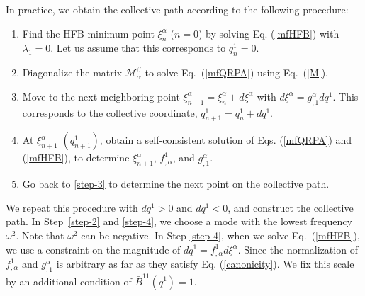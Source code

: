 \documentclass[%
superscriptaddress,
showpacs,
nofootinbib,
amsmath,amssymb,
aps,
prc,
twocolumn,
floatfix ]%
{revtex4-1}
\begin{document}
In practice, we obtain the collective path according to the following procedure:
\begin{enumerate}
\item Find the HFB minimum point $\xi^\alpha_n$ ($n=0$)
	by solving Eq. (\ref{mfHFB}) with $\lambda_1=0$.
	Let us assume that this corresponds to $q^1_n=0$.
\item \label{step-2}
	Diagonalize the matrix $\mathcal{M}^{\beta}_{\alpha}$
to solve Eq.~(\ref{mfQRPA}) using Eq.~(\ref{M}).
\item \label{step-3}
Move to the next meighboring point
$\xi^\alpha_{n+1}=\xi^\alpha_{n}+d\xi^\alpha$
with $d\xi^{\alpha}=g^{\alpha}_{,1}dq^1$.
This corresponds to the collective coordinate, $q^1_{n+1}=q^1_n+dq^1$.
\item \label{step-4}
At $\xi_{n+1}^\alpha$ $(q^1_{n+1})$,
obtain a self-consistent solution of
Eqs. (\ref{mfQRPA}) and (\ref{mfHFB}),
to determine
$\xi^\alpha_{n+1}$, $f^1_{,\alpha}$, and $g^\alpha_{,1}$.
\item Go back to \ref{step-3} to determine the next point
on the collective path.
\end{enumerate}
We repeat this procedure with $dq^1 > 0$ and $dq^1<0$, and
construct the collective path.
In Step~\ref{step-2} and \ref{step-4}, we choose a mode
with the lowest frequency $\omega^2$.
Note that $\omega^2$ can be negative.
In Step \ref{step-4}, when we solve Eq.~(\ref{mfHFB}), we use
a constraint on the magnitude of $dq^1=f^1_{,\alpha}d\xi^{\alpha}$.
Since the normalization of $f^1_{,\alpha}$ and $g^\alpha_{,1}$ is
arbitrary as far as they satisfy Eq. (\ref{canonicity}).
We fix this scale by an additional condition of $\bar{B}^{11}(q^1)=1$.
\end{document}
